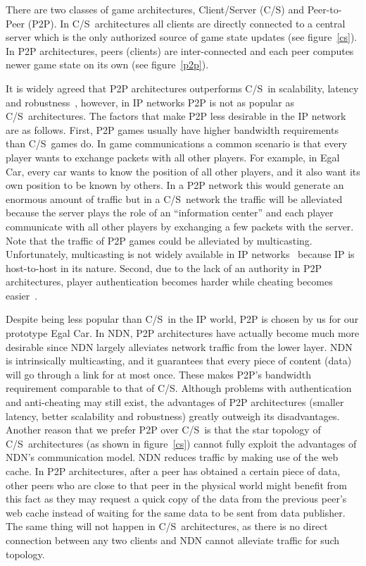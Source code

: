 \documentclass{article}
\newcommand{\cs}{C\slash S}
\begin{document}
There are two classes of game architectures, Client\slash Server (\cs) and Peer-to-Peer (P2P). In \cs~architectures all clients are directly connected to a central server which is the only authorized source of game state updates (see figure~\ref{cs}). In P2P architectures, peers (clients) are inter-connected and each peer computes newer game state on its own (see figure~\ref{p2p}). 

It is widely agreed that P2P architectures outperforms \cs~in scalability, latency and robustness~\cite{Fgame, Scheating}, however, in IP networks P2P is not as popular as \cs~architectures. The factors that make P2P less desirable in the IP network are as follows. First, P2P games usually have higher bandwidth requirements than \cs~games do. In game communications a common scenario is that every player wants to exchange packets with all other players. For example, in Egal Car, every car wants to know the position of all other players, and it also want its own position to be known by others. In a P2P network this would generate an enormous amount of traffic but in a \cs~network the traffic will be alleviated because the server plays the role of an ``information center'' and each player communicate with all other players by exchanging a few packets with the server. Note that the traffic of P2P games could be alleviated by multicasting. Unfortunately, multicasting is not widely available in IP networks~\cite{Fgame} because IP is host-to-host in its nature. Second, due to the lack of an authority in P2P architectures, player authentication becomes harder while cheating becomes easier~\cite{Scheating}.

Despite being less popular than \cs~in the IP world, P2P is chosen by us for our prototype Egal Car. In NDN, P2P architectures have actually become much more desirable since NDN largely alleviates network traffic from the lower layer. NDN is intrinsically multicasting, and it guarantees that every piece of content (data) will go through a link for at most once. These makes P2P's bandwidth requirement comparable to that of \cs. Although problems with authentication and anti-cheating may still exist, the advantages of P2P architectures (smaller latency, better scalability and robustness) greatly outweigh its disadvantages. Another reason that we prefer P2P over \cs~is that the star topology of \cs~architectures (as shown in figure~\ref{cs}) cannot fully exploit the advantages of NDN's communication model. NDN reduces traffic by making use of the web cache. In P2P architectures, after a peer has obtained a certain piece of data, other peers who are close to that peer in the physical world might benefit from this fact as they may request a quick copy of the data from the previous peer's web cache instead of waiting for the same data to be sent from data publisher. The same thing will not happen in \cs~architectures, as there is no direct connection between any two clients and NDN cannot alleviate traffic for such topology.
\end{document}
